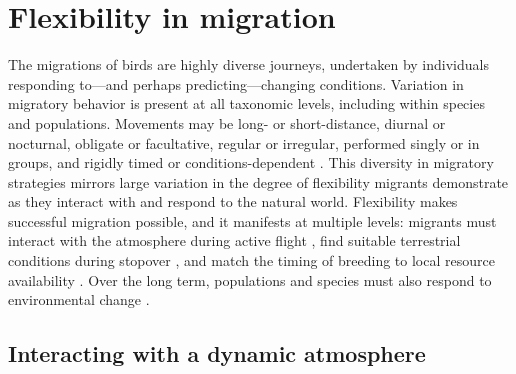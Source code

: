 \documentclass[a4paper, nobind]{templates/ociamthesis}
\begin{document}
\hypertarget{flexibility-in-migration}{%
\section*{Flexibility in migration}\label{flexibility-in-migration}}

The migrations of birds are highly diverse journeys, undertaken by individuals responding to---and perhaps predicting---changing conditions. Variation in migratory behavior is present at all taxonomic levels, including within species and populations. Movements may be long- or short-distance, diurnal or nocturnal, obligate or facultative, regular or irregular, performed singly or in groups, and rigidly timed or conditions-dependent \autocite{newtonMigrationEcologyBirds2008}. This diversity in migratory strategies mirrors large variation in the degree of flexibility migrants demonstrate as they interact with and respond to the natural world. Flexibility makes successful migration possible, and it manifests at multiple levels: migrants must interact with the atmosphere during active flight \autocite{richardsonTimingBirdMigration1990}, find suitable terrestrial conditions during stopover \autocite{alerstamOptimalBirdMigration2011}, and match the timing of breeding to local resource availability \autocite{charmantierClimateChangeTiming2014}. Over the long term, populations and species must also respond to environmental change \autocite{dunnEffectsClimateChange2019}.

\hypertarget{interacting-with-a-dynamic-atmosphere}{%
\subsection*{Interacting with a dynamic atmosphere}\label{interacting-with-a-dynamic-atmosphere}}
\end{document}
